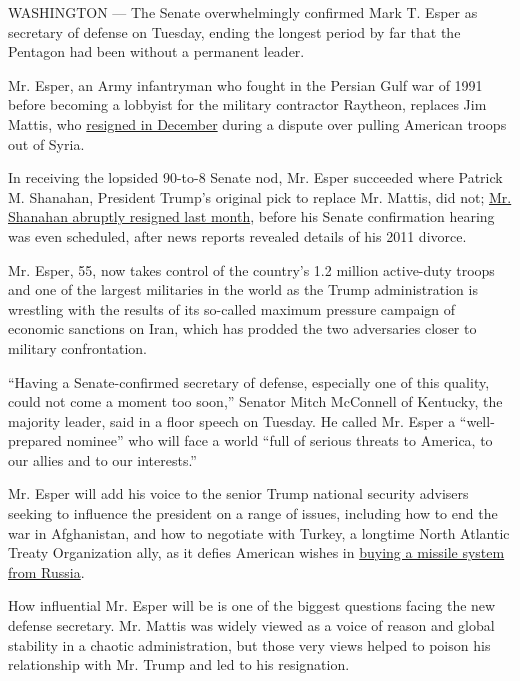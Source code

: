 WASHINGTON --- The Senate overwhelmingly confirmed Mark T. Esper as
secretary of defense on Tuesday, ending the longest period by far that
the Pentagon had been without a permanent leader.

Mr. Esper, an Army infantryman who fought in the Persian Gulf war of
1991 before becoming a lobbyist for the military contractor Raytheon,
replaces Jim Mattis, who
\href{https://www.nytimes.com/2018/12/20/us/politics/jim-mattis-defense-secretary-trump.html}{resigned
in December} during a dispute over pulling American troops out of Syria.

In receiving the lopsided 90-to-8 Senate nod, Mr. Esper succeeded where
Patrick M. Shanahan, President Trump's original pick to replace Mr.
Mattis, did not;
\href{https://www.nytimes.com/2019/06/18/us/politics/patrick-shanahan-defense-secretary.html}{Mr.
Shanahan abruptly resigned last month}, before his Senate confirmation
hearing was even scheduled, after news reports revealed details of his
2011 divorce.

Mr. Esper, 55, now takes control of the country's 1.2 million
active-duty troops and one of the largest militaries in the world as the
Trump administration is wrestling with the results of its so-called
maximum pressure campaign of economic sanctions on Iran, which has
prodded the two adversaries closer to military confrontation.

``Having a Senate-confirmed secretary of defense, especially one of this
quality, could not come a moment too soon,'' Senator Mitch McConnell of
Kentucky, the majority leader, said in a floor speech on Tuesday. He
called Mr. Esper a ``well-prepared nominee'' who will face a world
``full of serious threats to America, to our allies and to our
interests.''

Mr. Esper will add his voice to the senior Trump national security
advisers seeking to influence the president on a range of issues,
including how to end the war in Afghanistan, and how to negotiate with
Turkey, a longtime North Atlantic Treaty Organization ally, as it defies
American wishes in
\href{https://www.nytimes.com/2019/07/12/world/russia-turkey-missile-explain.html}{buying
a missile system from Russia}.

How influential Mr. Esper will be is one of the biggest questions facing
the new defense secretary. Mr. Mattis was widely viewed as a voice of
reason and global stability in a chaotic administration, but those very
views helped to poison his relationship with Mr. Trump and led to his
resignation.

